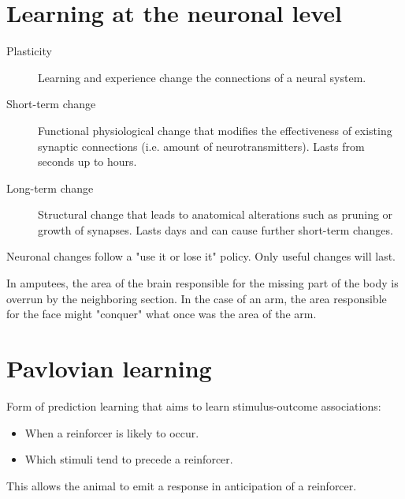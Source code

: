\section{Learning at the neuronal level}

\begin{description}
    \item[Plasticity]
        Learning and experience change the connections of a neural system.

    \item[Short-term change]
        Functional physiological change that modifies the effectiveness of existing synaptic connections (i.e. amount of neurotransmitters).
        Lasts from seconds up to hours.

    \item[Long-term change]
        Structural change that leads to anatomical alterations such as pruning or growth of synapses.
        Lasts days and can cause further short-term changes.
\end{description}

\begin{remark}
    Neuronal changes follow a "use it or lose it" policy.
    Only useful changes will last.
\end{remark}

\begin{example}
    In amputees, the area of the brain responsible for the missing part of the body is overrun by the neighboring section.
    In the case of an arm, the area responsible for the face might "conquer" what once was the area of the arm.
\end{example}



\section{Pavlovian learning}

Form of prediction learning that aims to learn stimulus-outcome associations:
\begin{itemize}
    \item When a reinforcer is likely to occur.
    \item Which stimuli tend to precede a reinforcer.
\end{itemize}
This allows the animal to emit a response in anticipation of a reinforcer.

